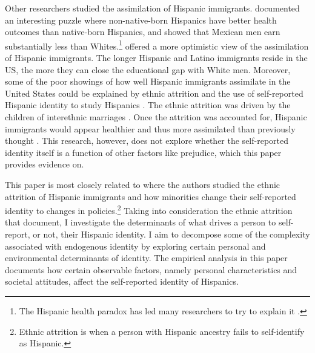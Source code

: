 \documentclass[12pt,english]{article}
\begin{document}
Other researchers studied the assimilation of Hispanic immigrants. \textcite{antecolUnhealthyAssimilationWhy2006} documented an interesting puzzle where non-native-born Hispanics have better health outcomes than native-born Hispanics, and \textcite{trejoWhyMexicanAmericans1997} showed that Mexican men earn substantially less than Whites.\footnote{The Hispanic health paradox has led many researchers to try to explain it \autocite{giuntellaAssimilationHealthEvidence2016,giuntellaAccelerationImmigrantUnhealthy2017,giuntellaReasonImmigrationImmigrants2018,giuntellaWhyDoesHealth2017a,antmanEthnicAttritionObserved2016,antmanEthnicAttritionAssimilation2020}.} \textcite{smithAssimilationLatinoGenerations2003} offered a more optimistic view of the assimilation of Hispanic immigrants. The longer Hispanic and Latino immigrants reside in the US, the more they can close the educational gap with White men. Moreover, some of the poor showings of how well Hispanic immigrants assimilate in the United States could be explained by ethnic attrition and the use of self-reported Hispanic identity to study Hispanics \autocite{duncanComplexityImmigrantGenerations2017,duncanWhoRemainsMexican2011,mengIntermarriageEconomicAssimilation2005,duncanIdentifyingLaterGenerationDescendants2018,duncanSocioeconomicIntegrationImmigrant2018,antmanEthnicAttritionObserved2016,antmanEthnicAttritionAssimilation2020}. The ethnic attrition was driven by the children of interethnic marriages \autocite{mengIntermarriageEconomicAssimilation2005,duncanEthnicIdentificationIntermarriage2005}. Once the attrition was accounted for, Hispanic immigrants would appear healthier and thus more assimilated than previously thought \autocite{antmanEthnicAttritionObserved2016,antmanEthnicAttritionAssimilation2020}. This research, however, does not explore whether the self-reported identity itself is a function of other factors like prejudice, which this paper provides evidence on. 

This paper is most closely related to \textcite{antmanEthnicAttritionObserved2016,antmanIncentivesIdentifyRacial2015,antmanAmericanIndianCasinos2021} where the authors studied the ethnic attrition of Hispanic immigrants and how minorities change their self-reported identity to changes in policies.\footnote{Ethnic attrition is when a person with Hispanic ancestry fails to self-identify as Hispanic.} Taking into consideration the ethnic attrition that \textcite{antmanEthnicAttritionObserved2016} document, I investigate the determinants of what drives a person to self-report, or not, their Hispanic identity. I aim to decompose some of the complexity associated with endogenous identity by exploring certain personal and environmental determinants of identity. The empirical analysis in this paper documents how certain observable factors, namely personal characteristics and societal attitudes, affect the self-reported identity of Hispanics.
\end{document}
